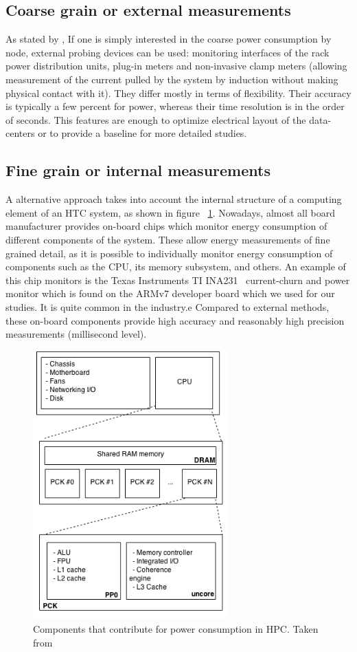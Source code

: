 \subsection*{Coarse grain or external measurements}
As stated by \cite{ACAT}, If one is simply interested in the coarse power consumption by node,
external probing devices can be used: monitoring interfaces
of the rack power distribution units, plug-in meters and non-invasive
clamp meters (allowing measurement of the
current pulled by the system by induction without making physical
contact with it). They differ mostly in terms of flexibility.
Their accuracy is typically a few percent for power, whereas their time
resolution is in the order of seconds. This features are enough
to optimize electrical layout of the data-centers or to provide a
baseline for more detailed studies.

\subsection*{Fine grain or internal measurements}
A alternative approach takes into account the internal structure of a
computing element of an HTC system, as shown in figure 
~\ref{fig:power-consumption-model}. Nowadays, almost all board manufacturer
provides on-board chips which monitor energy consumption of
different components of the system. These
allow energy measurements of fine grained detail, as it is possible
to individually monitor energy consumption of components such as
the CPU, its memory subsystem, and others. An example of this chip
monitors is the Texas Instruments TI INA231~\cite{TIINA231} current-churn
and power monitor which is found on the ARMv7 developer board which
we used for our studies. It is quite common in the industry.e
Compared to external methods, these on-board components provide
high accuracy and reasonably high precision measurements (millisecond
level).

\begin{figure}[tbp]
\centering
\includegraphics[width=75mm]{img/energy_model.png}
\caption{Components that contribute for power consumption in HPC. Taken from \cite{ACAT}}
\label{fig:power-consumption-model}
\end{figure}


